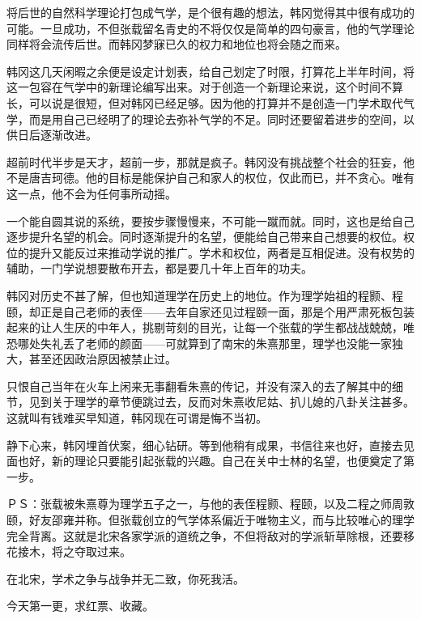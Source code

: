 将后世的自然科学理论打包成气学，是个很有趣的想法，韩冈觉得其中很有成功的可能。一旦成功，不但张载留名青史的不将仅仅是简单的四句豪言，他的气学理论同样将会流传后世。而韩冈梦寐已久的权力和地位也将会随之而来。

韩冈这几天闲暇之余便是设定计划表，给自己划定了时限，打算花上半年时间，将这一包容在气学中的新理论编写出来。对于创造一个新理论来说，这个时间不算长，可以说是很短，但对韩冈已经足够。因为他的打算并不是创造一门学术取代气学，而是用自己已经明了的理论去弥补气学的不足。同时还要留着进步的空间，以供日后逐渐改进。

超前时代半步是天才，超前一步，那就是疯子。韩冈没有挑战整个社会的狂妄，他不是唐吉珂德。他的目标是能保护自己和家人的权位，仅此而已，并不贪心。唯有这一点，他不会为任何事所动摇。

一个能自圆其说的系统，要按步骤慢慢来，不可能一蹴而就。同时，这也是给自己逐步提升名望的机会。同时逐渐提升的名望，便能给自己带来自己想要的权位。权位的提升又能反过来推动学说的推广。学术和权位，两者是互相促进。没有权势的辅助，一门学说想要散布开去，都是要几十年上百年的功夫。

韩冈对历史不甚了解，但也知道理学在历史上的地位。作为理学始祖的程颢、程颐，却正是自己老师的表侄——去年自家还见过程颐一面，那是个用严肃死板包装起来的让人生厌的中年人，挑剔苛刻的目光，让每一个张载的学生都战战兢兢，唯恐哪处失礼丢了老师的颜面——可就算到了南宋的朱熹那里，理学也没能一家独大，甚至还因政治原因被禁止过。

只恨自己当年在火车上闲来无事翻看朱熹的传记，并没有深入的去了解其中的细节，见到关于理学的章节便跳过去，反而对朱熹收尼姑、扒儿媳的八卦关注甚多。这就叫有钱难买早知道，韩冈现在可谓是悔不当初。

静下心来，韩冈埋首伏案，细心钻研。等到他稍有成果，书信往来也好，直接去见面也好，新的理论只要能引起张载的兴趣。自己在关中士林的名望，也便奠定了第一步。

ＰＳ：张载被朱熹尊为理学五子之一，与他的表侄程颢、程颐，以及二程之师周敦颐，好友邵雍并称。但张载创立的气学体系偏近于唯物主义，而与比较唯心的理学完全背离。这就是北宋各家学派的道统之争，不但将敌对的学派斩草除根，还要移花接木，将之夺取过来。

在北宋，学术之争与战争并无二致，你死我活。

今天第一更，求红票、收藏。

